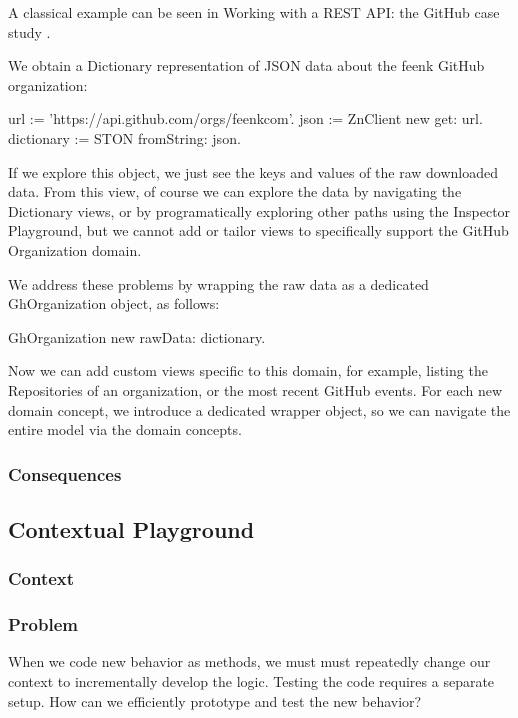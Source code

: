 \documentclass[sigconf]{acmart}
\begin{document}
A classical example can be seen in Working with a REST API: the GitHub case study .

We obtain a Dictionary representation of JSON data about the feenk GitHub organization:

url := 'https://api.github.com/orgs/feenkcom'.
json := ZnClient new get: url.
dictionary := STON fromString: json.
  
If we explore this object, we just see the keys and values of the raw downloaded data. From this view, of course we can explore the data by navigating the Dictionary views, or by programatically exploring other paths using the Inspector Playground, but we cannot add or tailor views to specifically support the GitHub Organization domain.

We address these problems by wrapping the raw data as a dedicated GhOrganization object, as follows:

GhOrganization new rawData: dictionary.
  
Now we can add custom views specific to this domain, for example, listing the Repositories of an organization, or the most recent GitHub events. For each new domain concept, we introduce a dedicated wrapper object, so we can navigate the entire model via the domain concepts.

\subsubsection*{Consequences}

\subsection*{Contextual Playground}\label{pat:contextualPlayground}
\subsubsection*{Context}
\subsubsection*{Problem}

When we code new behavior as methods, we must must repeatedly change our context to incrementally develop the logic. Testing the code requires a separate setup. How can we efficiently prototype and test the new behavior?
\end{document}
